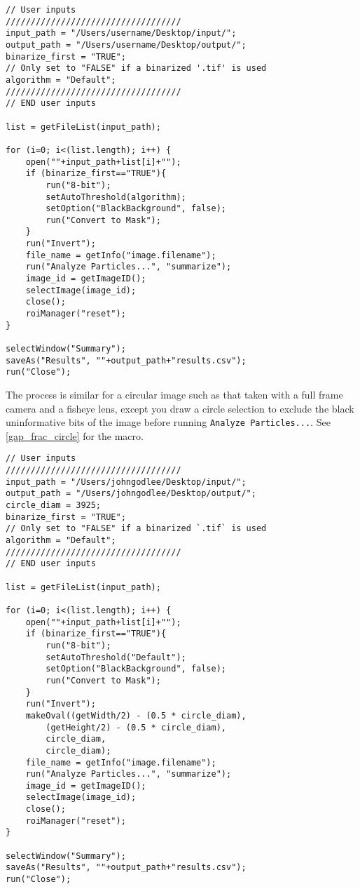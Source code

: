 \documentclass{article}
\newcommand\menu[1]{\texttt{\color{blue}#1}}
\newcommand\file[1]{\texttt{\underline{#1}}}
\begin{document}
\begin{minipage}{\linewidth}
\begin{lstlisting}[label=gap_frac_image, caption=ImageJ macro to calculate the gap fraction of a full image. The macro can also be found in \file{gap\_frac\_image.ijm}.]
// User inputs
///////////////////////////////////
input_path = "/Users/username/Desktop/input/";
output_path = "/Users/username/Desktop/output/";
binarize_first = "TRUE";
// Only set to "FALSE" if a binarized '.tif' is used
algorithm = "Default";
///////////////////////////////////
// END user inputs

list = getFileList(input_path);

for (i=0; i<(list.length); i++) {
	open(""+input_path+list[i]+"");
	if (binarize_first=="TRUE"){
		run("8-bit");
		setAutoThreshold(algorithm);
		setOption("BlackBackground", false);
		run("Convert to Mask");
	}
	run("Invert");
	file_name = getInfo("image.filename");
	run("Analyze Particles...", "summarize");
	image_id = getImageID();
	selectImage(image_id);
	close();
	roiManager("reset");
}

selectWindow("Summary"); 
saveAs("Results", ""+output_path+"results.csv"); 
run("Close");
\end{lstlisting}
\end{minipage}

The process is similar for a circular image such as that taken with a full frame camera and a fisheye lens, except you draw a circle selection to exclude the black uninformative bits of the image before running \menu{Analyze Particles...}. See \autoref{gap_frac_circle} for the macro. 

\begin{minipage}{\linewidth}
\begin{lstlisting}[label=gap_frac_circle, caption=ImageJ macro to calculate the gap fraction of a circular selection of an image. The macro can also be found in \file{gap\_frac\_circle.ijm}.]
// User inputs
///////////////////////////////////
input_path = "/Users/johngodlee/Desktop/input/";
output_path = "/Users/johngodlee/Desktop/output/";
circle_diam = 3925;
binarize_first = "TRUE";
// Only set to "FALSE" if a binarized `.tif` is used
algorithm = "Default";
///////////////////////////////////
// END user inputs

list = getFileList(input_path);

for (i=0; i<(list.length); i++) {
	open(""+input_path+list[i]+"");
	if (binarize_first=="TRUE"){
		run("8-bit");
		setAutoThreshold("Default");
		setOption("BlackBackground", false);
		run("Convert to Mask");
	}
	run("Invert");
	makeOval((getWidth/2) - (0.5 * circle_diam),
		(getHeight/2) - (0.5 * circle_diam),
		circle_diam,
		circle_diam);
	file_name = getInfo("image.filename");
	run("Analyze Particles...", "summarize");
	image_id = getImageID();
	selectImage(image_id);
	close();
	roiManager("reset");
}

selectWindow("Summary"); 
saveAs("Results", ""+output_path+"results.csv"); 
run("Close");
\end{lstlisting}
\end{minipage}
\end{document}
